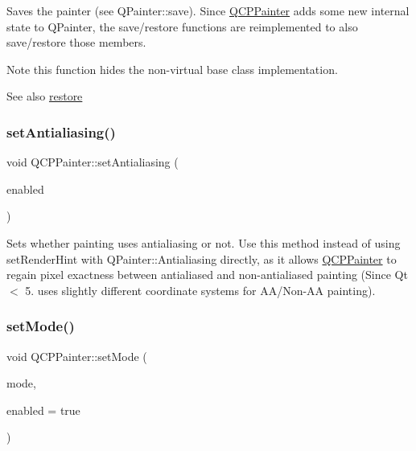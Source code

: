 Saves the painter (see Q\+Painter\+::save). Since \hyperlink{class_q_c_p_painter}{Q\+C\+P\+Painter} adds some new internal state to Q\+Painter, the save/restore functions are reimplemented to also save/restore those members.

\begin{DoxyNote}{Note}
this function hides the non-\/virtual base class implementation.
\end{DoxyNote}
\begin{DoxySeeAlso}{See also}
\hyperlink{class_q_c_p_painter_a64908e6298d5bbd83457dc987cc3a022}{restore} 
\end{DoxySeeAlso}
\hypertarget{class_q_c_p_painter_aaba1deb9188244d9ea65b035112b4d05}{}\label{class_q_c_p_painter_aaba1deb9188244d9ea65b035112b4d05} 
\subsubsection{\texorpdfstring{set\+Antialiasing()}{setAntialiasing()}}
{\footnotesize\ttfamily void Q\+C\+P\+Painter\+::set\+Antialiasing (\begin{DoxyParamCaption}\item[{bool}]{enabled }\end{DoxyParamCaption})}

Sets whether painting uses antialiasing or not. Use this method instead of using set\+Render\+Hint with Q\+Painter\+::\+Antialiasing directly, as it allows \hyperlink{class_q_c_p_painter}{Q\+C\+P\+Painter} to regain pixel exactness between antialiased and non-\/antialiased painting (Since Qt $<$ 5. uses slightly different coordinate systems for A\+A/\+Non-\/\+AA painting). \hypertarget{class_q_c_p_painter_af6b1f7d2bbc548b10aa55d8b6ad49577}{}\label{class_q_c_p_painter_af6b1f7d2bbc548b10aa55d8b6ad49577} 
\subsubsection{\texorpdfstring{set\+Mode()}{setMode()}}
{\footnotesize\ttfamily void Q\+C\+P\+Painter\+::set\+Mode (\begin{DoxyParamCaption}\item[{\hyperlink{class_q_c_p_painter_a156cf16444ff5e0d81a73c615fdb156d}{Q\+C\+P\+Painter\+::\+Painter\+Mode}}]{mode,  }\item[{bool}]{enabled = {\ttfamily true} }\end{DoxyParamCaption})}

